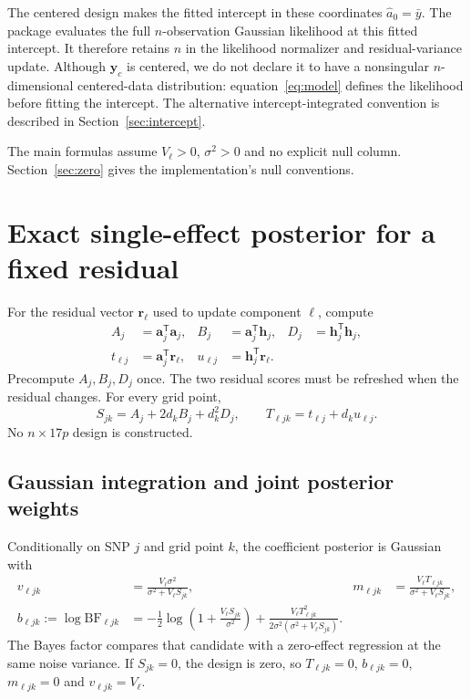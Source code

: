 \documentclass[11pt]{article}
\newcommand{\BF}{\mathrm{BF}}
\newcommand{\T}{^{\mathsf T}}
\newcommand{\yb}{\mathbf y_c}
\begin{document}
The centered design makes the fitted intercept in these coordinates
$\widehat a_0=\bar y$. The package evaluates the full $n$-observation
Gaussian likelihood at this fitted intercept. It therefore retains $n$
in the likelihood normalizer and residual-variance update. Although
$\yb$ is centered, we do not declare it to have a nonsingular
$n$-dimensional centered-data distribution: equation~\eqref{eq:model}
defines the likelihood before fitting the intercept. The alternative
intercept-integrated convention is described in Section~\ref{sec:intercept}.

The main formulas assume $V_\ell>0$, $\sigma^2>0$ and no explicit null
column. Section~\ref{sec:zero} gives the implementation's null conventions.

\section{Exact single-effect posterior for a fixed residual}
\label{sec:ser}
For the residual vector $\mathbf r_\ell$ used to update component $\ell$,
compute
\begin{align}
 A_j&=\mathbf a_j\T\mathbf a_j,&
 B_j&=\mathbf a_j\T\mathbf h_j,&
 D_j&=\mathbf h_j\T\mathbf h_j,\nonumber\\
 t_{\ell j}&=\mathbf a_j\T\mathbf r_\ell,&
 u_{\ell j}&=\mathbf h_j\T\mathbf r_\ell.
 \label{eq:stats}
\end{align}
Precompute $A_j,B_j,D_j$ once. The two residual scores must be refreshed
when the residual changes. For every grid point,
\begin{equation}
 S_{jk}=A_j+2d_kB_j+d_k^2D_j,\qquad
 T_{\ell jk}=t_{\ell j}+d_ku_{\ell j}.
 \label{eq:ST}
\end{equation}
No $n\times17p$ design is constructed.

\subsection{Gaussian integration and joint posterior weights}
Conditionally on SNP $j$ and grid point $k$, the coefficient posterior is
Gaussian with
\begin{align}
 v_{\ell jk}&=\frac{V_\ell\sigma^2}{\sigma^2+V_\ell S_{jk}},&
 m_{\ell jk}&=\frac{V_\ell T_{\ell jk}}{\sigma^2+V_\ell S_{jk}},
 \label{eq:moments}\\
 b_{\ell jk}:=\log\BF_{\ell jk}
 &=-\frac12\log\left(1+\frac{V_\ell S_{jk}}{\sigma^2}\right)
 +\frac{V_\ell T_{\ell jk}^2}
 {2\sigma^2(\sigma^2+V_\ell S_{jk})}.
 \label{eq:bf}
\end{align}
The Bayes factor compares that candidate with a zero-effect regression
at the same noise variance. If $S_{jk}=0$, the design is zero, so
$T_{\ell jk}=0$, $b_{\ell jk}=0$, $m_{\ell jk}=0$ and $v_{\ell jk}=V_\ell$.
\end{document}

